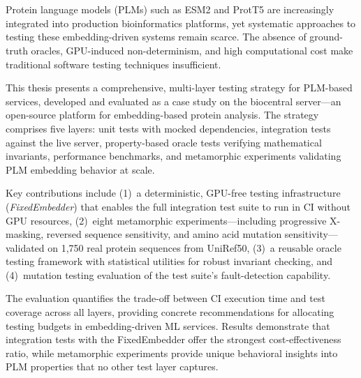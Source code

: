 \chapter{\abstractname}

Protein language models (PLMs) such as ESM2 and ProtT5 are increasingly integrated into production bioinformatics platforms, yet systematic approaches to testing these embedding-driven systems remain scarce. The absence of ground-truth oracles, GPU-induced non-determinism, and high computational cost make traditional software testing techniques insufficient.

This thesis presents a comprehensive, multi-layer testing strategy for PLM-based services, developed and evaluated as a case study on the biocentral server---an open-source platform for embedding-based protein analysis. The strategy comprises five layers: unit tests with mocked dependencies, integration tests against the live server, property-based oracle tests verifying mathematical invariants, performance benchmarks, and metamorphic experiments validating PLM embedding behavior at scale.

Key contributions include (1)~a deterministic, GPU-free testing infrastructure (\textit{FixedEmbedder}) that enables the full integration test suite to run in CI without GPU resources, (2)~eight metamorphic experiments---including progressive X-masking, reversed sequence sensitivity, and amino acid mutation sensitivity---validated on 1,750 real protein sequences from UniRef50, (3)~a reusable oracle testing framework with statistical utilities for robust invariant checking, and (4)~mutation testing evaluation of the test suite's fault-detection capability.

The evaluation quantifies the trade-off between CI execution time and test coverage across all layers, providing concrete recommendations for allocating testing budgets in embedding-driven ML services. Results demonstrate that integration tests with the FixedEmbedder offer the strongest cost-effectiveness ratio, while metamorphic experiments provide unique behavioral insights into PLM properties that no other test layer captures.
